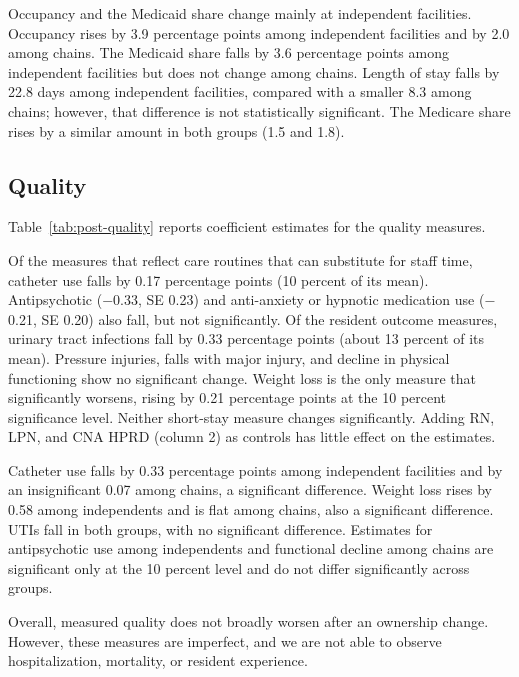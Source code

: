 \documentclass[12pt]{article}
\begin{document}
Occupancy and the Medicaid share change mainly at independent facilities. Occupancy rises by 3.9 percentage points among independent facilities and by 2.0 among chains. The Medicaid share falls by 3.6 percentage points among independent facilities but does not change among chains. Length of stay falls by 22.8 days among independent facilities, compared with a smaller 8.3 among chains; however, that difference is not statistically significant. The Medicare share rises by a similar amount in both groups (1.5 and 1.8).


\FloatBarrier

\subsection{Quality}

Table~\ref{tab:post-quality} reports coefficient estimates for the quality measures.

Of the measures that reflect care routines that can substitute for staff time, catheter use falls by 0.17 percentage points (10 percent of its mean). Antipsychotic ($-$0.33, SE 0.23) and anti-anxiety or hypnotic medication use ($-$0.21, SE 0.20) also fall, but not significantly. Of the resident outcome measures, urinary tract infections fall by 0.33 percentage points (about 13 percent of its mean). Pressure injuries, falls with major injury, and decline in physical functioning show no significant change. Weight loss is the only measure that significantly worsens, rising by 0.21 percentage points at the 10 percent significance level. Neither short-stay measure changes significantly. Adding RN, LPN, and CNA HPRD (column 2) as controls has little effect on the estimates.

Catheter use falls by 0.33 percentage points among independent facilities and by an insignificant 0.07 among chains, a significant difference. Weight loss rises by 0.58 among independents and is flat among chains, also a significant difference. UTIs fall in both groups, with no significant difference. Estimates for antipsychotic use among independents and functional decline among chains are significant only at the 10 percent level and do not differ significantly across groups.

Overall, measured quality does not broadly worsen after an ownership change. However, these measures are imperfect, and we are not able to observe hospitalization, mortality, or resident experience. 
\end{document}
